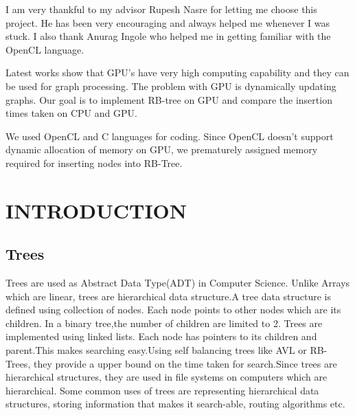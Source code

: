 \documentclass[BTech]{iitmdiss}
\begin{document}
I am very thankful to my advisor Rupesh Nasre for letting me choose this project. He has been very encouraging and always helped me whenever I was stuck. I also thank Anurag Ingole who helped me in getting familiar with the OpenCL language.


\abstract
{}
\vspace*{24pt}

\noindent Latest works show that GPU's have very high computing capability and they can be used for graph processing. The problem with GPU is dynamically updating graphs. Our goal is to implement RB-tree on GPU and compare the insertion times taken on CPU and GPU.

We used OpenCL and C languages for coding. Since OpenCL doesn't support dynamic allocation of memory on GPU, we prematurely assigned memory required for inserting nodes into RB-Tree. 

\pagebreak


\begin{singlespace}
\tableofcontents
\thispagestyle{empty}
\end{singlespace}


\chapter{INTRODUCTION}
\label{chap:intro}
\section{Trees}
Trees are used as Abstract Data Type(ADT) in Computer Science. Unlike Arrays which are linear, trees are hierarchical data structure.A tree data structure is defined using collection of nodes. Each node points to other nodes which are its children. In a binary tree,the number of children are limited to 2. Trees are implemented using linked lists. Each node has pointers to its children and parent.This makes searching easy.Using self balancing trees like AVL or RB-Trees, they provide a upper bound on the time taken for search.Since trees are hierarchical structures, they are used in file systems on computers which are hierarchical. Some common uses of trees are representing hierarchical data structures, storing information that makes it search-able, routing algorithms etc.\\
\end{document}
